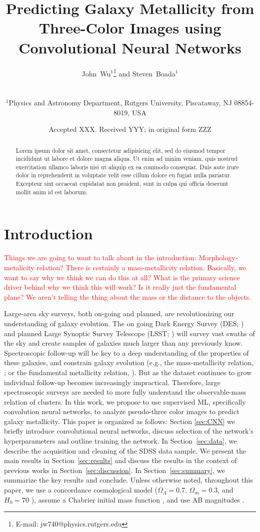 \documentclass[fleqn,usenatbib]{mnras}
\title[Metallicity with CNNs]{Predicting Galaxy Metallicity from Three-Color Images using Convolutional Neural Networks}
\author[Wu and Boada]
{\parbox{\textwidth}{John~Wu$^{1}$\thanks{E-mail: jw740@physics.rutgers.edu} and
Steven~Boada$^{1}$}\vspace{0.4cm}\
\\
\parbox{\textwidth}{$^{1}$Physics and Astronomy Department, Rutgers University, Piscataway, NJ 08854-8019, USA\\}}
\date{Accepted XXX. Received YYY; in original form ZZZ}
\newcommand{\editorial}[1]{\textcolor{red}{#1}}
\begin{document}
\label{firstpage}
\pagerange{\pageref{firstpage}--\pageref{lastpage}}
\maketitle

\begin{abstract}
\noindent
Lorem ipsum dolor sit amet, consectetur adipisicing elit, sed do eiusmod tempor incididunt ut labore et dolore magna aliqua. Ut enim ad minim veniam, quis nostrud exercitation ullamco laboris nisi ut aliquip ex ea commodo consequat. Duis aute irure dolor in reprehenderit in voluptate velit esse cillum dolore eu fugiat nulla pariatur. Excepteur sint occaecat cupidatat non proident, sunt in culpa qui officia deserunt mollit anim id est laborum.
\end{abstract}

\section{Introduction}\label{sec:introduction}
\editorial{Things we are going to want to talk about in the introduction: Morphology-metalicity relation? There is certainly a mass-metallicity relation. Basically, we want to say why we think we can do this at all? What is the primary science driver behind why we think this will work? Is it really just the fundamental plane? We aren't telling the thing about the mass or the distance to the objects.}


Large-area sky surveys, both on-going and planned, are revolutionizing our understanding of galaxy evolution. The on going Dark Energy Survey (DES; \citealt{DES2005}) and planned Large Synoptic Survey Telescope (LSST; \citealt{LSST2012}) will survey vast swaths of the sky and create samples of galaxies much larger than any previously know. Spectroscopic follow-up will be key to a deep understanding of the properties of these galaxies, and constrain galaxy evolution (e.g., the mass-metallicity relation, \citealt{Tremonti+05}; or the fundamental metallicity relation, \citealt{2010paper,2011paper}). But as the dataset continues to grow individual follow-up becomes increasingly impractical. Therefore, large spectroscopic surveys are needed to more fully understand the observable-mass relation of clusters.
In this work, we propose to use supervised ML, specifically convolution neural networks, to analyze pseudo-three color images to predict galaxy metallicity.
This paper is organized as follows: Section \ref{sec:CNN} we briefly introduce convolutional neural networks, discuss selection of the network's hyperparameters and outline training the network. In Section~\ref{sec:data}, we describe the acquisition and cleaning of the SDSS data sample. We present the main results in Section~\ref{sec:results} and discuss the results in the context of previous works in Section~\ref{sec:discussion}. In Section~\ref{sec:summary}, we summarize the key results and conclude.
Unless otherwise noted, throughout this paper, we use a concordance cosmological model ($\Omega_\Lambda = 0.7$, $\Omega_m = 0.3$, and $H_0= 70$ \kms \mpc), assume a Chabrier initial mass function \citep{Chabrier2003}, and use AB magnitudes \citep{Oke1974}.
\end{document}
